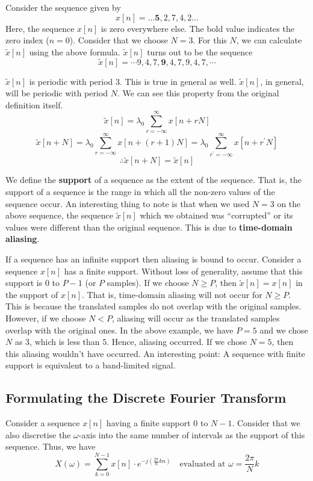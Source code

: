 \documentclass{article}
\theoremstyle{definition}
\begin{document}
Consider the sequence given by 
\[
    x[n] = \ldots  \mathbf{5} , 2 , 7 , 4 , 2 \ldots
\]
Here, the sequence $x[n]$ is zero everywhere else. The bold value indicates the zero index ($n=0$). Consider that we choose $N=3$. For this $N$, we can calculate $\widetilde{x}[n]$ using the above formula. $\widetilde{x}[n]$ turns out to be the sequence
\[
    \widetilde{x}[n] = \cdots 9, 4, 7, \mathbf{9}, 4, 7, 9, 4, 7, \cdots
\]

$\widetilde{x}[n]$ is periodic with period $3$. This is true in general as well. $\widetilde{x}[n]$, in general, will be periodic with period $N$. We can see this property from the original definition itself.
\[
    \widetilde{x}[n] = \lambda_0 \sum_{r= -\infty}^{\infty} x[n + rN]
\]
\[
    \widetilde{x}[n+N] = \lambda_0 \sum_{r= -\infty}^{\infty} x[n + (r+1)N] = \lambda_0 \sum_{r^{\prime}= -\infty}^{\infty} x[n + r^{\prime}N]
\]
\[
    \therefore \widetilde{x}[n+N] = \widetilde{x}[n]
\]

We define the \textbf{support} of a sequence as the extent of the sequence. That is, the support of a sequence is the range in which all the non-zero values of the sequence occur. An interesting thing to note is that when we used $N=3$ on the above sequence, the sequence $\widetilde{x}[n]$ which we obtained was ``corrupted'' or its values were different than the original sequence. This is due to \textbf{time-domain aliasing}. \medskip

If a sequence has an infinite support then aliasing is bound to occur. Consider a sequence $x[n]$ has a finite support. Without loss of generality, assume that this support is $0$ to $P-1$ (or $P$ samples). If we choose $N \geq P$, then $\widetilde{x}[n] = x[n]$ in the support of $x[n]$. That is, time-domain aliasing will not occur for $N \geq P$. This is because the translated samples do not overlap with the original samples. However, if we choose $N < P$, aliasing will occur as the translated samples overlap with the original ones. In the above example, we have $P=5$ and we chose $N$ as $3$, which is less than $5$. Hence, aliasing occurred. If we chose $N=5$, then this aliasing wouldn't have occurred. An interesting point: A sequence with finite support is equivalent to a band-limited signal. \medskip

\subsection{Formulating the Discrete Fourier Transform}

Consider a sequence $x[n]$ having a finite support $0$ to $N-1$. Consider that we also discretise the $\omega$-axis into the same number of intervals as the support of this sequence. Thus, we have
\[
    X(\omega) = \sum_{k=0}^{N-1} x[n] \cdot e^{-j\left( \frac{2\pi}{N}kn \right)} \quad \text{evaluated at } \omega = \frac{2\pi}{N}k
\]
\end{document}
